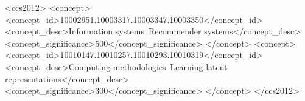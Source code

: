 \documentclass[sigconf,anonymous,review]{templates/acmart}
\begin{document}







\renewcommand{\shortauthors}{Kim et al.}



\begin{CCSXML}
<ccs2012>
 <concept>
  <concept_id>10002951.10003317.10003347.10003350</concept_id>
  <concept_desc>Information systems~Recommender systems</concept_desc>
  <concept_significance>500</concept_significance>
 </concept>
 <concept>
  <concept_id>10010147.10010257.10010293.10010319</concept_id>
  <concept_desc>Computing methodologies~Learning latent representations</concept_desc>
  <concept_significance>300</concept_significance>
 </concept>
</ccs2012>
\end{CCSXML}
\end{document}

